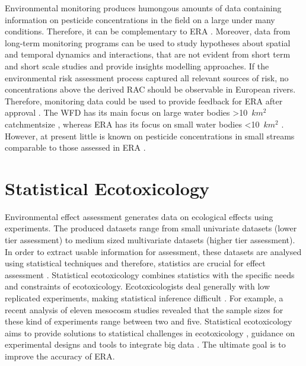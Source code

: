 Environmental monitoring produces humongous amounts of data containing information on pesticide concentrations in the field on a large under many conditions.
Therefore, it can be complementary to ERA \citep{suter_ecological_2007}. 
Moreover, data from long-term monitoring programs can be used to study hypotheses about spatial and temporal dynamics and interactions, that are not evident from short term and short scale studies \citep{gitzen_design_2012} and provide insights modelling approaches. 
If the environmental risk assessment process captured all relevant sources of risk, no concentrations above the derived RAC should be observable in European rivers. 
Therefore, monitoring data could be used to provide feedback for ERA after approval \citep{knauer_pesticides_2016}. 
The WFD has its main focus on large water bodies \textgreater 10~$km^2$ catchmentsize \citep{european_union_directive_2000}, whereas ERA has its focus on small water bodies \textless 10~$km^2$ \citep{european_union_regulation_2009, brock_aquatic_2006}.
However, at present little is known on pesticide concentrations in small streams comparable to those assessed in ERA \citep{lorenz_specifics_2016, biggs_importance_2016}. 



\section{Statistical Ecotoxicology}

Environmental effect assessment generates data on ecological effects using experiments. 
The produced datasets range from small univariate datasets (lower tier assessment) to medium sized multivariate datasets (higher tier assessment).
In order to extract usable information for assessment, these datasets are analysed using statistical techniques and therefore, statistics are crucial for effect assessment \citep{newman_quantitative_2012}.
Statistical ecotoxicology combines statistics with the specific needs and constraints of ecotoxicology. 
Ecotoxicologists deal generally with low replicated experiments, making statistical inference difficult \citep{van_der_hoeven_power_1998}.
For example, a recent analysis of eleven mesocosm studies revealed that the sample sizes for these kind of experiments range between two and five.
Statistical ecotoxicology aims to provide solutions to statistical challenges in ecotoxicology \citep{fox_comment_2016}, guidance on experimental designs \citep{johnson_power_2015} and tools to integrate big data \citep {van_den_brink_new_2016}.
The ultimate goal is to improve the accuracy of ERA. 


